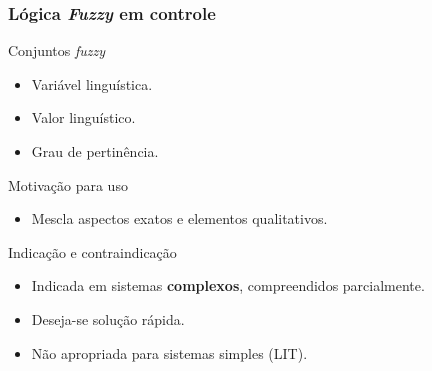 \documentclass[hyperref={pdfpagelabels=false},table]{beamer}
\begin{document}
\begin{frame}
\begin{overprint}
\begin{figure}[h]
%
	\end{figure}
	\end{overprint}
\end{frame}

\begin{frame}
	\frametitle{Lógica \textit{Fuzzy} em controle}
	\vspace{-0.1cm}
	\begin{block}{Conjuntos \textit{fuzzy}}
		\begin{itemize}
		  \item Variável linguística.
		  \item Valor linguístico.
		  \item Grau de pertinência.
		\end{itemize}
	\end{block}	
	\pause
	\begin{exampleblock}{Motivação para uso}
		\begin{itemize}
		  \item Mescla aspectos exatos e elementos qualitativos.
		\end{itemize}
	\end{exampleblock}
	\pause
	\begin{block}{Indicação e contraindicação}
		\begin{itemize}
		  \item Indicada em sistemas \textbf{complexos}, compreendidos parcialmente.
		  \item Deseja-se solução rápida.
		  \item Não apropriada para sistemas simples (LIT).
		\end{itemize}
	\end{block}
\end{frame}

\begin{frame}
	
\end{frame}
\end{document}
